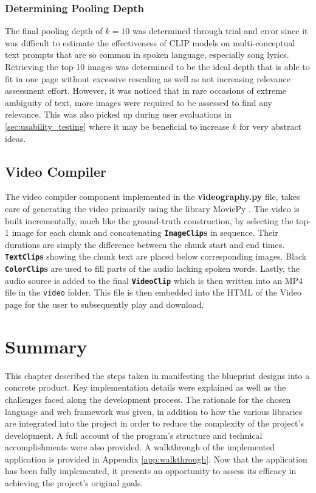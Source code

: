 \documentclass{l4proj}
\begin{document}
\subsubsection{Determining Pooling Depth}
\label{sec:determining_pool_depth}
The final pooling depth of $k=10$ was determined through trial and error since it was difficult to estimate the effectiveness of CLIP models on multi-conceptual text prompts that are so common in spoken language, especially song lyrics. Retrieving the top-10 images was determined to be the ideal depth that is able to fit in one page without excessive rescaling as well as not increasing relevance assessment effort. However, it was noticed that in rare occasions of extreme ambiguity of text, more images were required to be assessed to find any relevance. This was also picked up during user evaluations in \ref{sec:usability_testing} where it may be beneficial to increase $k$ for very abstract ideas.


\subsection{Video Compiler}
The video compiler component implemented in the \textbf{videography.py} file, takes care of generating the video primarily using the library MoviePy \citep{moviepy}. The video is built incrementally, much like the ground-truth construction, by selecting the top-1 image for each chunk and concatenating \textbf{\lstinline|ImageClip|s} in sequence. Their durations are simply the difference between the chunk start and end times. \textbf{\lstinline|TextClip|s} showing the chunk text are placed below corresponding images. Black \textbf{\lstinline|ColorClip|s} are used to fill parts of the audio lacking spoken words. Lastly, the audio source is added to the final \textbf{\lstinline|VideoClip|} which is then written into an MP4 file in the \lstinline|video| folder. This file is then embedded into the HTML of the Video page for the user to subsequently play and download.


\section{Summary}
This chapter described the steps taken in manifesting the blueprint designs into a concrete product. Key implementation details were explained as well as the challenges faced along the development process. The rationale for the chosen language and web framework was given, in addition to how the various libraries are integrated into the project in order to reduce the complexity of the project's development. A full account of the program's structure and technical accomplishments were also provided. A walkthrough of the implemented application is provided in Appendix \ref{app:walkthrough}. Now that the application has been fully implemented, it presents an opportunity to assess its efficacy in achieving the project's original goals. 
\end{document}

